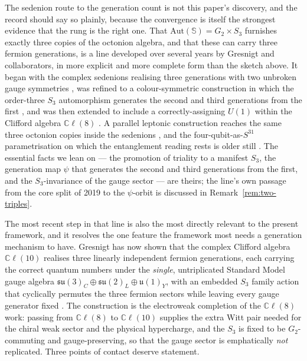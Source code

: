 The sedenion route to the generation count is not this paper's discovery, and the record should say
so plainly, because the convergence is itself the strongest evidence that the rung is the right one.
That $\mathrm{Aut}(\mathbb{S}) = G_2 \times S_3$ furnishes exactly three copies of the octonion
algebra, and that these can carry three fermion generations, is a line developed over several years by
Gresnigt and collaborators, in more explicit and more complete form than the sketch above. It began
with the complex sedenions realising three generations with two unbroken gauge symmetries
\autocite{gillardgresnigt2019three}, was refined to a colour-symmetric construction in which the
order-three $S_3$ automorphism generates the second and third generations from the first
\autocite{gresnigtgourlayvarma2023three}, and was then extended to include a correctly-assigning
$U(1)$ within the Clifford algebra $\mathbb{C}\ell(8)$ \autocite{gourlaygresnigt2024algebraic}. A
parallel leptonic construction reaches the same three octonion copies inside the sedenions
\autocite{tangtang2023unified}, and the four-qubit-as-$S^{31}$ parametrisation on which the
entanglement reading rests is older still \autocite{pinillaluthra2009hopf}. The essential facts we
lean on --- the promotion of triality to a manifest $S_3$, the generation map $\psi$ that generates
the second and third generations from the first, and the $S_3$-invariance of the gauge sector ---
are theirs; the line's own passage from the core split of 2019 to the $\psi$-orbit is discussed in
Remark~\ref{rem:two-triples}.

The most recent step in that line is also the most directly relevant to the present framework, and it
resolves the one feature the framework most needs a generation mechanism to have. Gresnigt has now
shown that the complex Clifford algebra $\mathbb{C}\ell(10)$ realises three linearly independent
fermion generations, each carrying the correct quantum numbers under the \emph{single},
untriplicated Standard Model gauge algebra
$\mathfrak{su}(3)_C \oplus \mathfrak{su}(2)_L \oplus \mathfrak{u}(1)_Y$, with an embedded $S_3$ family
action that cyclically permutes the three fermion sectors while leaving every gauge generator fixed
\autocite{gresnigt2026three}. The construction is the electroweak completion of the $\mathbb{C}\ell(8)$
work: passing from $\mathbb{C}\ell(8)$ to $\mathbb{C}\ell(10)$ supplies the extra Witt pair needed for
the chiral weak sector and the physical hypercharge, and the $S_3$ is fixed to be
$G_2$-commuting and gauge-preserving, so that the gauge sector is emphatically \emph{not} replicated.
Three points of contact deserve statement.

